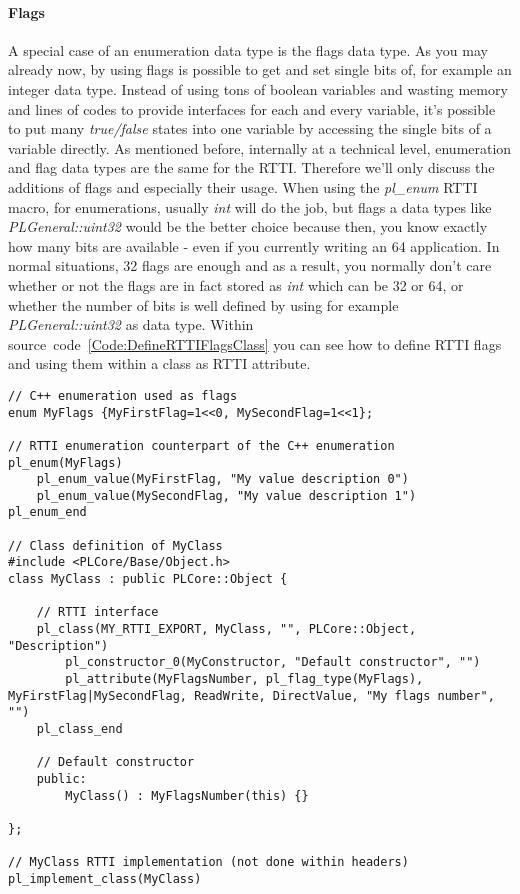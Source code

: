 \paragraph{Flags}
A special case of an enumeration data type is the flags data type. As you may already now, by using flags is possible to get and set single bits of, for example an integer data type. Instead of using tons of boolean variables and wasting memory and lines of codes to provide interfaces for each and every variable, it's possible to put many \emph{true/false} states into one variable by accessing the single bits of a variable directly. As mentioned before, internally at a technical level, enumeration and flag data types are the same for the RTTI. Therefore we'll only discuss the additions of flags and especially their usage. When using the \emph{pl\_enum} RTTI macro, for enumerations, usually \emph{int} will do the job, but flags a data types like \emph{PLGeneral::uint32} would be the better choice because then, you know exactly how many bits are available - even if you currently writing an \SI{64}{\bit} application. In normal situations, 32 flags are enough and as a result, you normally don't care whether or not the flags are in fact stored as \emph{int} which can be \SI{32}{\bit} or \SI{64}{\bit}, or whether the number of bits is well defined by using for example \emph{PLGeneral::uint32} as data type. Within source~code~\ref{Code:DefineRTTIFlagsClass} you can see how to define RTTI flags and using them within a class as RTTI attribute.
\begin{lstlisting}[label=Code:DefineRTTIFlagsClass,caption={Defining new RTTI flags and a RTTI class using them}]
// C++ enumeration used as flags
enum MyFlags {MyFirstFlag=1<<0, MySecondFlag=1<<1};

// RTTI enumeration counterpart of the C++ enumeration
pl_enum(MyFlags)
	pl_enum_value(MyFirstFlag, "My value description 0")
	pl_enum_value(MySecondFlag, "My value description 1")
pl_enum_end

// Class definition of MyClass
#include <PLCore/Base/Object.h>
class MyClass : public PLCore::Object {

	// RTTI interface
	pl_class(MY_RTTI_EXPORT, MyClass, "", PLCore::Object, "Description")
		pl_constructor_0(MyConstructor, "Default constructor", "")
		pl_attribute(MyFlagsNumber, pl_flag_type(MyFlags), MyFirstFlag|MySecondFlag, ReadWrite, DirectValue, "My flags number", "")
	pl_class_end

	// Default constructor
	public:
		MyClass() : MyFlagsNumber(this) {}

};

// MyClass RTTI implementation (not done within headers)
pl_implement_class(MyClass)
\end{lstlisting}
